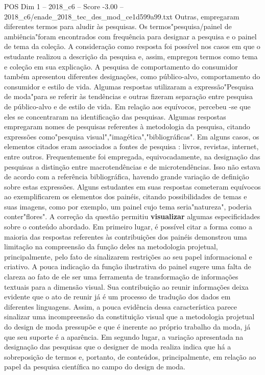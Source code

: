 \begin{textsample}{POS Dim 1 – 2018\_c6 – Score -3.00 – 2018\_c6/enade\_2018\_tec\_des\_mod\_ce1d599a99.txt}
Outras, empregaram diferentes termos para aludir às pesquisas.
Os termos"pesquisa/painel de ambiência"foram encontrados com frequência para designar a pesquisa e o painel de tema da coleção.
A consideração como resposta foi possível nos casos em que o estudante realizou a descrição da pesquisa e, assim, empregou termos como tema e coleção em sua explicação.
A pesquisa de comportamento do consumidor também apresentou diferentes designações, como público-alvo, comportamento do consumidor e estilo de vida.
Algumas respostas utilizaram a expressão"Pesquisa de moda"para se referir às tendências e outras fizeram separação entre pesquisa de público-alvo e de estilo de vida.
Em relação aos equívocos, percebeu -se que eles se concentraram na identificação das pesquisas.
Algumas respostas empregaram nomes de pesquisas referentes à metodologia da pesquisa, citando expressões como"pesquisa visual","imagética","bibliográficas".
Em alguns casos, os elementos citados eram associados a fontes de pesquisa : livros, revistas, internet, entre outros.
Frequentemente foi empregada, equivocadamente, na designação das pesquisas a distinção entre macrotendências e de microtendências.
Isso não estava de acordo com a referência bibliográfica, havendo grande variação de definição sobre estas expressões.
Alguns estudantes em suas respostas cometeram equívocos ao exemplificarem os elementos dos painéis, citando possibilidades de temas e suas imagens, como por exemplo, um painel cujo tema seria"natureza", poderia conter"flores".
A correção da questão permitiu \textbf{visualizar} algumas especificidades sobre o conteúdo abordado.
Em primeiro lugar, é possível citar a forma como a maioria das respostas referentes às contribuições dos painéis demonstrou uma limitação na compreensão da função deles na metodologia projetual, principalmente, pelo fato de sinalizarem restrições ao seu papel informacional e criativo.
A pouca indicação da função ilustrativa do painel sugere uma falta de clareza ao fato de ele ser uma ferramenta de transformação de informações textuais para a dimensão visual.
Sua contribuição ao reunir informações deixa evidente que o ato de reunir já é um processo de tradução dos dados em diferentes linguagens.
Assim, a pouca evidência dessa característica parece sinalizar uma incompreensão da constituição visual que a metodologia projetual do design de moda pressupõe e que é inerente ao próprio trabalho da moda, já que seu suporte é a aparência.
Em segundo lugar, a variação apresentada na designação das pesquisas que o designer de moda realiza indica que há a sobreposição de termos e, portanto, de conteúdos, principalmente, em relação ao papel da pesquisa científica no campo do design de moda.

\end{textsample}
